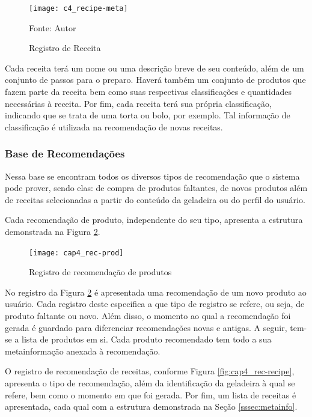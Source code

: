 \begin{figure}[htb]
    \caption{Registro de Receita}
    \label{fig:c4_recipe-meta}
    \texttt{[image: c4\_recipe-meta]}
    
    Fonte: Autor
\end{figure}

Cada receita terá um nome ou uma descrição breve de seu conteúdo, além de um conjunto de passos para o preparo. Haverá também um conjunto de produtos que fazem parte da receita bem como suas respectivas classificações e quantidades necessárias à receita. Por fim, cada receita terá sua própria classificação, indicando que se trata de uma torta ou bolo, por exemplo. Tal informação de classificação é utilizada na recomendação de novas receitas.

\subsubsection{Base de Recomendações}


Nessa base se encontram todos os diversos tipos de recomendação que o sistema pode prover, sendo elas: de compra de produtos faltantes, de novos produtos além de receitas selecionadas a partir do conteúdo da geladeira ou do perfil do usuário.

Cada recomendação de produto, independente do seu tipo, apresenta a estrutura demonstrada na Figura \ref{fig:cap4_rec-prod}.

\begin{figure}[htb]
    \caption{Registro de recomendação de produtos}
    \label{fig:cap4_rec-prod}
    \texttt{[image: cap4\_rec-prod]}
\end{figure}

No registro da Figura \ref{fig:cap4_rec-prod} é apresentada uma recomendação de um novo produto ao usuário. Cada registro deste especifica a que tipo de registro se refere, ou seja, de produto faltante ou novo. Além disso, o momento ao qual a recomendação foi gerada é guardado para diferenciar recomendações novas e antigas. A seguir, tem-se a lista de produtos em si. Cada produto recomendado tem todo a sua metainformação anexada à recomendação.


O registro de recomendação de receitas, conforme Figura \ref{fig:cap4_rec-recipe}, apresenta o tipo de recomendação, além da identificação da geladeira à qual se refere, bem como o momento em que foi gerada. Por fim, um lista de receitas é apresentada, cada qual com a estrutura demonstrada na Seção \ref{sssec:metainfo}.

